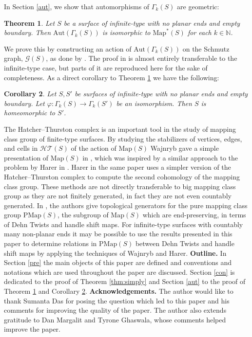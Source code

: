 \documentclass[11pt]{article}
\def\N{\mathbb{N}}
\def\vp{\varphi}
\def\map{\text{Map}}
\newtheorem{ntheorem}{Theorem}
\newtheorem{ncorollary}[ntheorem]{Corollary}
\begin{document}
In Section \ref{aut}, we show that automorphisms of $\Gamma_k(S)$ are geometric:
\begin{ntheorem}\label{thm:geometric}
  Let $S$ be a surface of infinite-type with no planar ends and empty boundary. Then $\text{Aut}(\Gamma_k(S))$ is isomorphic to $\map^*(S)$ for each $k\in \N$.
\end{ntheorem}
We prove this by constructing an action of $\text{Aut}(\Gamma_k(S))$ on the Schmutz graph, $ \mathcal{G}(S)$, as done by \cite{irmak2004}. The proof in \cite{irmak2004} is almost entirely transferable to the infinite-type case, but parts of it are reproduced here for the sake of completeness. As a direct corollary to Theorem \ref{thm:geometric} we have the following:
\begin{ncorollary}\label{cor:iso}
  Let $S,S'$ be surfaces of infinite-type with no planar ends and empty boundary. Let $\vp:\Gamma_k(S)\to \Gamma_k(S')$ be an isomorphism. Then $S$ is homeomorphic to $S'$.
\end{ncorollary}
The Hatcher--Thurston complex is an important tool in the study of mapping class group of finite-type surfaces. By studying the stabilizers of vertices, edges, and cells in $ \mathcal{HT}(S)$ of the action of $\map(S)$ Wajnryb gave a simple presentation of $\map(S)$ in \cite{wajnryb2}, which was inspired by a similar approach to the problem by Harer in \cite{harer}. Harer in the same paper uses a simpler version of the Hatcher--Thurston complex to compute the second cohomology of the mapping class group. These methods are not directly transferable to big mapping class group as they are not finitely generated, in fact they are not even countably generated. In \cite{patel}, the authors give topological generators for the pure mapping class group $\text{PMap}(S)$, the subgroup of $\map(S)$ which are end-preserving, in terms of Dehn Twists and handle shift maps. For infinite-type surfaces with countably many non-planar ends it may be possible to use the results presented in this paper to determine relations in $\text{PMap}(S)$ between Dehn Twists and handle shift maps by applying the techniques of Wajnryb and Harer.
\vspace{1em}
\newline
\textbf{Outline.} In Section \ref{pre} the main objects of this paper are defined and conventions and notations which are used throughout the paper are discussed. Section \ref{con} is dedicated to the proof of Theorem \ref{thm:simply} and Section \ref{aut} to the proof of Theorem \ref{thm:geometric} and Corollary \ref{cor:iso}.
\vspace{1em}
\newline
\textbf{Acknowledgements.} The author would like to thank Sumanta Das for posing the question which led to this paper and his comments for improving the quality of the paper. The author also extends gratitude to Dan Margalit and Tyrone Ghaswala, whose comments helped improve the paper.
\end{document}
